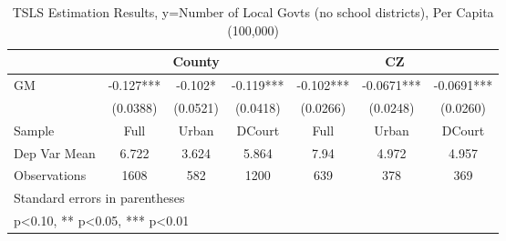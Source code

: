\begin{table}[htbp]\centering
\def\sym#1{\ifmmode^{#1}\else\(^{#1}\)\fi}
\caption{TSLS Estimation Results, y=Number of Local Govts (no school districts), Per Capita (100,000)}
\begin{tabular}{l*{6}{c}}
\toprule
                &\multicolumn{3}{c}{County}            &\multicolumn{3}{c}{CZ}                \\\cmidrule(lr){2-4}\cmidrule(lr){5-7}
\midrule
GM              &   -0.127***&   -0.102*  &   -0.119***&   -0.102***&  -0.0671***&  -0.0691***\\
                & (0.0388)   & (0.0521)   & (0.0418)   & (0.0266)   & (0.0248)   & (0.0260)   \\
\midrule
Sample          &     Full   &    Urban   &   DCourt   &     Full   &    Urban   &   DCourt   \\
Dep Var Mean    &    6.722   &    3.624   &    5.864   &     7.94   &    4.972   &    4.957   \\
Observations    &     1608   &      582   &     1200   &      639   &      378   &      369   \\
\bottomrule
\multicolumn{7}{l}{\footnotesize Standard errors in parentheses}\\
\multicolumn{7}{l}{\footnotesize * p<0.10, ** p<0.05, *** p<0.01}\\
\end{tabular}
\end{table}
